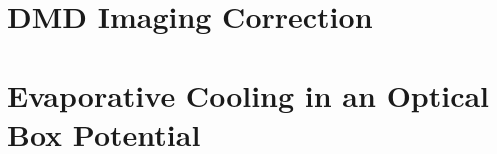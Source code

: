 \documentclass[captions=tableheading]{cam-thesis}
\begin{document}
\frontmatter


\mainmatter
\pagestyle{scrheadings}




\part{DMD Imaging Correction}















\part{Evaporative Cooling in an Optical Box Potential}








% 


\end{document}
